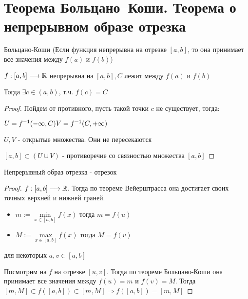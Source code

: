 \section{Теорема Больцано–Коши. Теорема о непрерывном образе отрезка}
\begin{theorem-non}
    Больцано-Коши (Если функция непрерывна на отрезке $[a, b]$, то она принимает все значения между $f(a)$ и $f(b)$)

    $f: [a, b] \longrightarrow \mathbb{R}$ непрерывна на $[a, b], C$ лежит между $f(a)$ и $f(b)$

    Тогда $\exists c\in (a, b)$, т.ч. $f(c) = C$
    \begin{proof}
        Пойдем от противного, пусть такой точки $c$ не существует, тогда: 

        $U = f^{-1}(-\infty, C) \\
        V = f^{-1}(C, +\infty)$

        $U, V$ - открытые множества. Они не пересекаются

        $[a, b] \subset (U \cup V)$ - противоречие со связностью множества $[a, b]$
    \end{proof}
\end{theorem-non}

\begin{theorem-non}
    Непрерывный образ отрезка - отрезок 

    \begin{proof} \quad

        $f:[a, b] \longrightarrow \mathbb{R}$.
        Тогда по теореме Вейерштрасса она достигает своих точных верхней и нижней граней.
        \begin{itemize}
            \item[] $m:= \min\limits_{x \in [a, b]}{f(x)}$ \qquad тогда $m = f(u)$
            \item[] $M:= \max\limits_{x \in [a, b]}{f(x)}$ \qquad тогда $M = f(v)$
        \end{itemize} для некоторых $a, v \in [a, b]$

        Посмотрим на $f$ на отрезке $[u, v]$. Тогда по теореме Больцано-Коши она принимает все значения между $f(u) = m$
        и $f(v) = M$. Тогда $[m, M] \subset f([a, b]) \subset [m, M] \Longrightarrow f([a, b]) = [m, M]$ 
    \end{proof}
\end{theorem-non}
